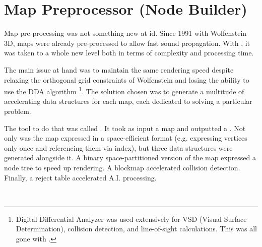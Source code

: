 \section{Map Preprocessor (Node Builder)}
Map pre-processing was not something new at id. Since 1991 with Wolfenstein 3D, maps were already pre-processed to allow fast sound propagation. With \doom, it was taken to a whole new level both in terms of complexity and processing time.\\
\par
The main issue at hand was to maintain the same rendering speed despite relaxing the orthogonal grid constraints of Wolfenstein and losing the ability to use the DDA algorithm \footnote{Digital Differential Analyzer was used extensively for VSD (Visual Surface Determination), collision detection, and line-of-sight calculations. This was all gone with \doom.}. The solution chosen was to generate a multitude of accelerating data structures for each map, each dedicated to solving a particular problem.\\
\par
 The tool to do that was called . It took as input a  map and outputted a . Not only was the map expressed in a space-efficient format (e.g. expressing vertices only once and referencing them via index), but three data structures were generated alongside it. A binary space-partitioned version of the map expressed a node tree to speed up rendering. A blockmap accelerated collision detection. Finally, a reject table accelerated A.I. processing.\\
 \par
{}\\%
\par
{}
\par


